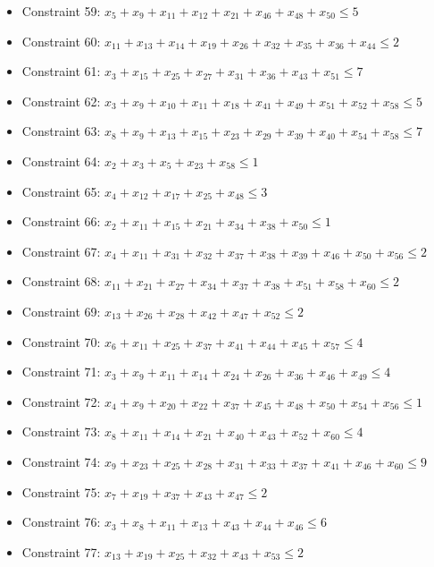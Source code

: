 \documentclass[11pt]{article}
\begin{document}
\begin{itemize}
\item Constraint 59: $x_{5} + x_{9} + x_{11} + x_{12} + x_{21} + x_{46} + x_{48} + x_{50} \le 5$
\item Constraint 60: $x_{11} + x_{13} + x_{14} + x_{19} + x_{26} + x_{32} + x_{35} + x_{36} + x_{44} \le 2$
\item Constraint 61: $x_{3} + x_{15} + x_{25} + x_{27} + x_{31} + x_{36} + x_{43} + x_{51} \le 7$
\item Constraint 62: $x_{3} + x_{9} + x_{10} + x_{11} + x_{18} + x_{41} + x_{49} + x_{51} + x_{52} + x_{58} \le 5$
\item Constraint 63: $x_{8} + x_{9} + x_{13} + x_{15} + x_{23} + x_{29} + x_{39} + x_{40} + x_{54} + x_{58} \le 7$
\item Constraint 64: $x_{2} + x_{3} + x_{5} + x_{23} + x_{58} \le 1$
\item Constraint 65: $x_{4} + x_{12} + x_{17} + x_{25} + x_{48} \le 3$
\item Constraint 66: $x_{2} + x_{11} + x_{15} + x_{21} + x_{34} + x_{38} + x_{50} \le 1$
\item Constraint 67: $x_{4} + x_{11} + x_{31} + x_{32} + x_{37} + x_{38} + x_{39} + x_{46} + x_{50} + x_{56} \le 2$
\item Constraint 68: $x_{11} + x_{21} + x_{27} + x_{34} + x_{37} + x_{38} + x_{51} + x_{58} + x_{60} \le 2$
\item Constraint 69: $x_{13} + x_{26} + x_{28} + x_{42} + x_{47} + x_{52} \le 2$
\item Constraint 70: $x_{6} + x_{11} + x_{25} + x_{37} + x_{41} + x_{44} + x_{45} + x_{57} \le 4$
\item Constraint 71: $x_{3} + x_{9} + x_{11} + x_{14} + x_{24} + x_{26} + x_{36} + x_{46} + x_{49} \le 4$
\item Constraint 72: $x_{4} + x_{9} + x_{20} + x_{22} + x_{37} + x_{45} + x_{48} + x_{50} + x_{54} + x_{56} \le 1$
\item Constraint 73: $x_{8} + x_{11} + x_{14} + x_{21} + x_{40} + x_{43} + x_{52} + x_{60} \le 4$
\item Constraint 74: $x_{9} + x_{23} + x_{25} + x_{28} + x_{31} + x_{33} + x_{37} + x_{41} + x_{46} + x_{60} \le 9$
\item Constraint 75: $x_{7} + x_{19} + x_{37} + x_{43} + x_{47} \le 2$
\item Constraint 76: $x_{3} + x_{8} + x_{11} + x_{13} + x_{43} + x_{44} + x_{46} \le 6$
\item Constraint 77: $x_{13} + x_{19} + x_{25} + x_{32} + x_{43} + x_{53} \le 2$

\end{itemize}
\end{document}
